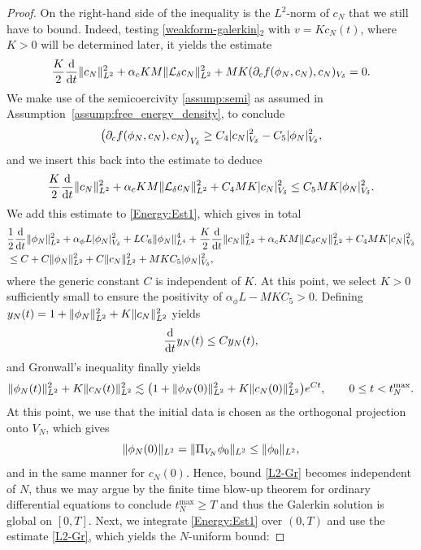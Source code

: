 \documentclass[]{article}
\newcommand{\ddt}{\frac{\textup{d}}{\textup{d}t}}
\DeclarePairedDelimiter{\abs}{\lvert}{\rvert}
\DeclarePairedDelimiter{\norm}{\lVert}{\rVert}
\begin{document}
\begin{proof}
	On the right-hand side of the inequality is the $L^2$-norm of $c_N$ that we still have to bound. Indeed, testing \eqref{weakform-galerkin}$_2$ with $v=Kc_N(t)$, where $K>0$ will be determined later, it yields the estimate
	$$\frac{K}{2} \ddt\norm{c_N}_{L^2}^2 + \alpha_c KM \norm{\mathcal{L}_\delta c_N}_{L^2}^2   + M K (\partial_c f(\phi_N,c_N),c_N)_{V_\delta}=0.$$
	We make use of the semicoercivity \eqref{assump:semi} as assumed in Assumption~\ref{assump:free_energy_density}, to conclude
	$$\bigl(\partial_c f(\phi_N,c_N), c_N \bigr)_{V_\delta} \geq C_4 \abs{c_N}_{{V_\delta}}^{2} - C_5 \abs{\phi_N}_{{V_\delta}}^2,$$
	and we insert this back into the estimate to deduce
	$$\frac{K}{2} \ddt \norm{c_N}_{L^2}^2 + \alpha_c KM \norm{\mathcal{L}_\delta c_N}_{L^2}^2+ C_4 M K \abs{c_N}_{V_\delta}^2 \leq C_5 M K  \abs{\phi_N}_{{V_\delta}}^2.$$
	We add this estimate to \eqref{Energy:Est1}, which gives in total
	$$\begin{aligned} &\frac12 \ddt \norm{\phi_N}_{L^2}^2 + \alpha_\phi L  \abs{\phi_N}_{V_\delta}^2+ LC_6  \norm{\phi_N}_{L^4}^4+\frac{K}{2} \ddt \norm{c_N}_{L^2}^2  +\alpha_c KM \norm{\mathcal{L}_\delta c_N}_{L^2}^2+ C_4 MK \abs{c_N}_{V_\delta}^2
		\\ &\le C+ C \norm{\phi_N}_{L^2}^2 + C \norm{c_N}_{L^2}^2 + MK C_5 \abs{\phi_N}_{{V_\delta}}^2,
	\end{aligned}$$
	where the generic constant $C$ is independent of $K$.
	At this point, we select $K>0$ sufficiently small to ensure the positivity of $\alpha_\phi L - M K C_5 > 0$.
	Defining $y_N(t)=1+\norm{\phi_N}_{L^2}^2 + K\norm{c_N}_{L^2}^2$ yields 
	\[
	\ddt y_N(t) \leq C y_N(t),
	\]
	and Gronwall's inequality \cite[Lemma II.4.10]{boyer2012mathematical} finally yields
	\begin{equation}\label{L2-Gr}
		\norm{\phi_N(t)}_{L^{2}}^{2}+K\norm{c_N(t)}_{L^{2}}^{2}
		\lesssim \bigl(1+\|\phi_N(0)\|_{L^{2}}^{2}+K\|c_N(0)\|_{L^{2}}^{2}\bigr)
		e^{Ct},
		\qquad
		0\le t<t_N^{\max}.
	\end{equation}
	At this point, we use that the initial data is chosen as the orthogonal projection onto $V_N$, which gives $$\|\phi_N(0)\|_{L^2}=\|\Pi_{V_N} \phi_0 \|_{L^2} \leq \norm{\phi_0}_{L^2},$$
	and in the same manner for $c_N(0)$.
	Hence, bound \eqref{L2-Gr} becomes independent of $N$, thus we may argue by the finite time blow-up theorem for ordinary differential
	equations to conclude $t_N^{\max}\ge T$ and thus the
	Galerkin solution is global on $[0,T]$. Next, we integrate \eqref{Energy:Est1} over $(0,T)$
	and use the estimate \eqref{L2-Gr}, which yields the $N$-uniform bound:

\end{proof}
\end{document}
